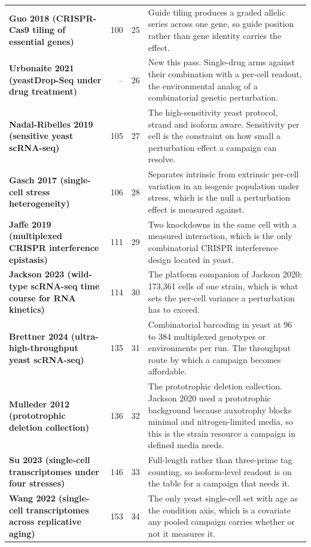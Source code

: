 \begin{longtable}{@{}L{46mm} r@{\hspace{6pt}} r@{\hspace{6pt}} L{104mm}@{}}
\textbf{Guo 2018 (CRISPR-Cas9 tiling of essential genes)} & 100 & 25 & Guide tiling produces a graded allelic series across one gene, so guide position rather than gene identity carries the effect. \\
\addlinespace[5pt]
\textbf{Urbonaite 2021 (yeastDrop-Seq under drug treatment)} & -- & 26 & New this pass. Single-drug arms against their combination with a per-cell readout, the environmental analog of a combinatorial genetic perturbation. \\
\addlinespace[5pt]
\textbf{Nadal-Ribelles 2019 (sensitive yeast scRNA-seq)} & 105 & 27 & The high-sensitivity yeast protocol, strand and isoform aware. Sensitivity per cell is the constraint on how small a perturbation effect a campaign can resolve. \\
\addlinespace[5pt]
\textbf{Gasch 2017 (single-cell stress heterogeneity)} & 106 & 28 & Separates intrinsic from extrinsic per-cell variation in an isogenic population under stress, which is the null a perturbation effect is measured against. \\
\addlinespace[5pt]
\textbf{Jaffe 2019 (multiplexed CRISPR interference epistasis)} & 111 & 29 & Two knockdowns in the same cell with a measured interaction, which is the only combinatorial CRISPR interference design located in yeast. \\
\addlinespace[5pt]
\textbf{Jackson 2023 (wild-type scRNA-seq time course for RNA kinetics)} & 114 & 30 & The platform companion of Jackson 2020: 173,361 cells of one strain, which is what sets the per-cell variance a perturbation has to exceed. \\
\addlinespace[5pt]
\textbf{Brettner 2024 (ultra-high-throughput yeast scRNA-seq)} & 135 & 31 & Combinatorial barcoding in yeast at 96 to 384 multiplexed genotypes or environments per run. The throughput route by which a campaign becomes affordable. \\
\addlinespace[5pt]
\textbf{Mulleder 2012 (prototrophic deletion collection)} & 136 & 32 & The prototrophic deletion collection. Jackson 2020 used a prototrophic background because auxotrophy blocks minimal and nitrogen-limited media, so this is the strain resource a campaign in defined media needs. \\
\addlinespace[5pt]
\textbf{Su 2023 (single-cell transcriptomes under four stresses)} & 146 & 33 & Full-length rather than three-prime tag counting, so isoform-level readout is on the table for a campaign that needs it. \\
\addlinespace[5pt]
\textbf{Wang 2022 (single-cell transcriptomes across replicative aging)} & 153 & 34 & The only yeast single-cell set with age as the condition axis, which is a covariate any pooled campaign carries whether or not it measures it. \\

\end{longtable}
